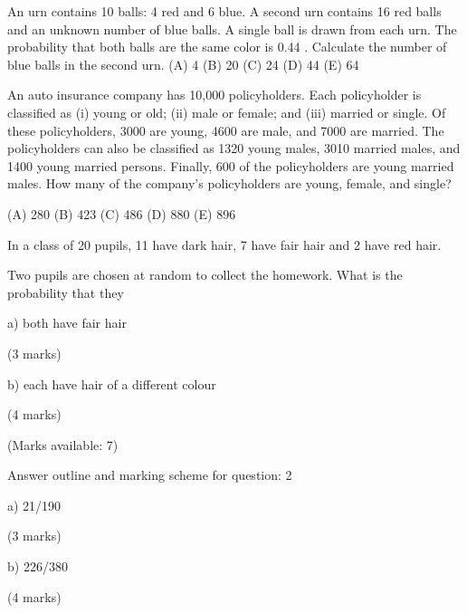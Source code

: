 An urn contains 10 balls: 4 red and 6 blue. A second urn contains 16 red balls and an 
unknown number of blue balls. A single ball is drawn from each urn. The probability 
that both balls are the same color is 0.44 . 
Calculate the number of blue balls in the second urn. 
 (A) 4 
 (B) 20 
 (C) 24 
 (D) 44 
 (E) 64



An auto insurance company has 10,000 policyholders. Each policyholder is classified as 
 (i) young or old; 
 (ii) male or female; and 
 (iii) married or single. 
Of these policyholders, 3000 are young, 4600 are male, and 7000 are married. The 
policyholders can also be classified as 1320 young males, 3010 married males, and 1400 
young married persons. Finally, 600 of the policyholders are young married males. 
 How many of the company’s policyholders are young, female, and single? 

(A) 280 
(B) 423 
(C) 486 
 (D) 880 
(E) 896 


In a class of 20 pupils, 11 have dark hair, 7 have fair hair and 2 have red hair.

Two pupils are chosen at random to collect the homework. What is the probability that they

a) both have fair hair

(3 marks)

b) each have hair of a different colour

(4 marks)

(Marks available: 7)

Answer outline and marking scheme for question: 2

a) 21/190

(3 marks)

b) 226/380

(4 marks)
